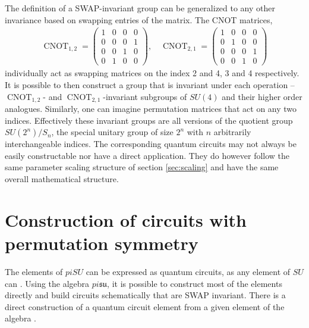 \documentclass[%
 reprint,
 amsmath,amssymb,
 aps,
]{revtex4-2}
\newcommand{\CNOT}{\operatorname{CNOT}}
\theoremstyle{definition}%
\begin{document}

The definition of a SWAP-invariant group can be generalized to any other invariance based on swapping entries of the matrix. The CNOT matrices,
\begin{align*}
    \CNOT_{1,2} = \begin{pmatrix}
        1 & 0 & 0 & 0\\
        0 & 0 & 0 & 1\\
        0 & 0 & 1 & 0\\
        0 & 1 & 0 & 0
    \end{pmatrix},\quad
        \CNOT_{2,1} = \begin{pmatrix}
        1 & 0 & 0 & 0\\
        0 & 1 & 0 & 0\\
        0 & 0 & 0 & 1\\
        0 & 0 & 1 & 0
    \end{pmatrix}
\end{align*}
individually act as swapping matrices on the index 2 and 4, 3 and 4 respectively. It is possible to then construct a group that is invariant under each operation – $\CNOT_{1,2}$- and $\CNOT_{2,1}$-invariant subgroups of $SU(4)$ and their higher order analogues. Similarly, one can imagine permutation matrices that act on any two indices. Effectively these invariant groups are all versions of the quotient group $SU(2^n)/S_n$, the special unitary group of size $2^n$ with $n$ arbitrarily interchangeable indices. The corresponding quantum circuits may not always be easily constructable nor have a direct application. They do however follow the same parameter scaling structure of section \ref{sec:scaling} and have the same overall mathematical structure.



\section{Construction of circuits with permutation symmetry}\label{sec:construction}


The elements of $piSU$ can be expressed as quantum circuits, as any element of $SU$ can \cite{mansky_near-optimal_2023}. Using the algebra $pi\mathfrak{su}$, it is possible to construct most of the elements directly and build circuits schematically that are SWAP invariant. There is a direct construction of a quantum circuit element from a given element of the algebra \cite{mansky_decomposition_2023}.
\end{document}
